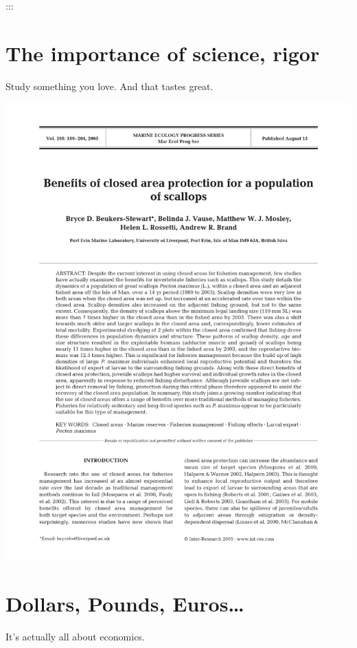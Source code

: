 \documentclass[
]{book}
\begin{document}
:::

\hypertarget{the-importance-of-science-rigor}{%
\chapter{The importance of science, rigor}\label{the-importance-of-science-rigor}}

Study something you love. And that tastes great.

\begin{center}\includegraphics{_images/benefits} \end{center}

\hypertarget{dollars-pounds-euros}{%
\chapter{Dollars, Pounds, Euros\ldots{}}\label{dollars-pounds-euros}}

It's actually all about economics.
\end{document}
